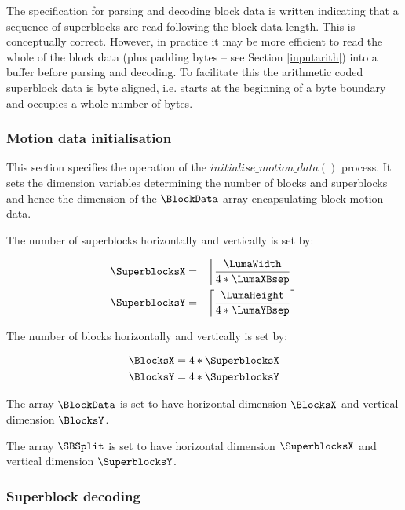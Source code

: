 \begin{informative}
The specification for parsing and decoding block data is written indicating that a sequence of 
superblocks are read following the block data length. This is conceptually correct. However, 
in practice it may be more efficient to read the whole of the block data (plus padding bytes -- 
see Section \ref{inputarith}) into a buffer before parsing and decoding. To facilitate this the arithmetic coded 
superblock data is byte aligned, i.e. starts at the beginning of a byte boundary and occupies a 
whole number of bytes.
\end{informative}

\subsubsection{Motion data initialisation}

\label{motioninit}

This section specifies the operation of the $initialise\_motion\_data()$ process. It sets the dimension variables determining the
number of blocks and superblocks and hence the dimension of the $\BlockData$ array encapsulating block motion
data.

The number of superblocks horizontally and vertically is set by:

\begin{eqnarray*}
\SuperblocksX & = & \left\lceil \frac{\LumaWidth}{4*\LumaXBsep} \right\rceil  \\
\SuperblocksY & = & \left\lceil \frac{\LumaHeight}{4*\LumaYBsep} \right\rceil 
\end{eqnarray*}

The number of blocks horizontally and vertically is set by:

\begin{eqnarray*}
\BlocksX = 4*\SuperblocksX \\
\BlocksY = 4*\SuperblocksY
\end{eqnarray*}

The array $\BlockData$ is set to have horizontal dimension $\BlocksX$ and vertical dimension $\BlocksY$.

The array $\SBSplit$ is set to have horizontal dimension $\SuperblocksX$ and vertical dimension $\SuperblocksY$.

\subsubsection{Superblock decoding}

